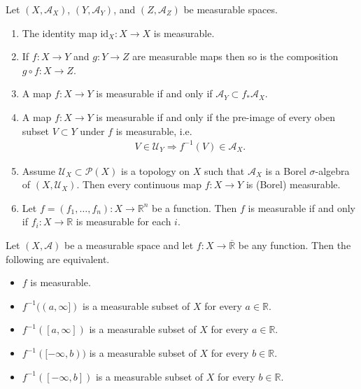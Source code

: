 \begin{theorem}
    Let \((X, \mathcal{A}_X)\), \((Y, \mathcal{A}_Y)\), and \((Z, \mathcal{A}_Z)\) be measurable spaces.
    \begin{enumerate}
        \item The identity map \(\text{id}_X: X \rightarrow X\) is measurable.
        \item If \(f: X \rightarrow Y\) and \(g: Y \rightarrow Z\) are measurable maps then so is the composition \(g \circ f: X \rightarrow Z\).
        \item A map \(f: X \rightarrow Y\) is measurable if and only if \(\mathcal{A}_Y \subset f_* \mathcal{A}_X\).
        \item A map \(f: X \rightarrow Y\) is measurable if and only if the pre-image of every oben subset \(V \subset Y\) under \(f\) is measurable, i.e.
        \begin{align}
            V \in \mathcal{U}_Y \Rightarrow f^{-1}(V) \in \mathcal{A}_X \text{.}
        \end{align}
        \item Assume \(\mathcal{U}_X \subset \mathcal{P}(X)\) is a topology on \(X\) such that \(\mathcal{A}_X\) is a Borel \(\sigma\)-algebra of \((X, \mathcal{U}_X)\). Then every continuous map \(f: X \rightarrow Y\) is (Borel) measurable.
        \item Let \(f = (f_1, \dots, f_n): X \rightarrow \mathbb{R}^n\) be a function. Then \(f\) is measurable if and only if \(f_i: X \rightarrow \mathbb{R}\) is measurable for each \(i\).
    \end{enumerate}
\end{theorem}
%
\begin{theorem}
    Let \((X, \mathcal{A})\) be a measurable space and let \(f: X \rightarrow \overline{\mathbb{R}}\) be any function. Then the following are equivalent.
    \begin{itemize}
        \item \(f\) is measurable.
        \item \(f^{-1}( (a, \infty])\) is a measurable subset of \(X\) for every \(a \in \mathbb{R}\).
        \item \(f^{-1}( [a, \infty])\) is a measurable subset of \(X\) for every \(a \in \mathbb{R}\).
        \item \(f^{-1}( [-\infty, b))\) is a measurable subset of \(X\) for every \(b \in \mathbb{R}\).
        \item \(f^{-1}( [-\infty, b])\) is a measurable subset of \(X\) for every \(b \in \mathbb{R}\).
    \end{itemize}
\end{theorem}
